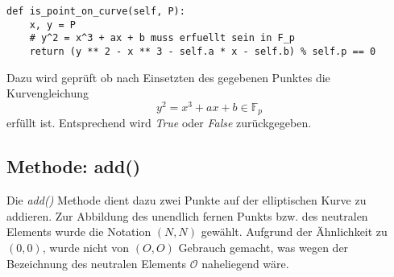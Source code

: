 \vspace{\baselineskip}
\begin{lstlisting}[caption={Methode: is\_point\_on\_curve()}, captionpos=b]
def is_point_on_curve(self, P):
	x, y = P
    # y^2 = x^3 + ax + b muss erfuellt sein in F_p
    return (y ** 2 - x ** 3 - self.a * x - self.b) % self.p == 0
\end{lstlisting}
\vspace{\baselineskip}
Dazu wird geprüft ob nach Einsetzten des gegebenen Punktes die Kurvengleichung $$y^2 = x^3 + ax + b \in \mathbb{F}_p$$ erfüllt ist. Entsprechend wird \textit{True} oder \textit{False} zurückgegeben.

\subsection{Methode: add()}
Die \textit{add()} Methode dient dazu zwei Punkte auf der elliptischen Kurve zu addieren. Zur Abbildung des unendlich fernen Punkts bzw. des neutralen Elements wurde die Notation $(N,N)$ gewählt. Aufgrund der Ähnlichkeit zu $(0,0)$, wurde nicht von $(O,O)$ Gebrauch gemacht, was wegen der Bezeichnung des neutralen Elements $\mathcal{O}$ naheliegend wäre. 

